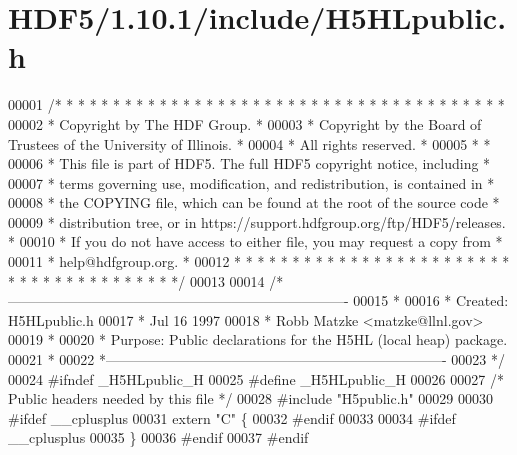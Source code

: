 \hypertarget{_h_d_f5_21_810_81_2include_2_h5_h_lpublic_8h_source}{}\section{H\+D\+F5/1.10.1/include/\+H5\+H\+Lpublic.h}
\label{_h_d_f5_21_810_81_2include_2_h5_h_lpublic_8h_source}

\begin{DoxyCode}
00001 \textcolor{comment}{/* * * * * * * * * * * * * * * * * * * * * * * * * * * * * * * * * * * * * * *}
00002 \textcolor{comment}{ * Copyright by The HDF Group.                                               *}
00003 \textcolor{comment}{ * Copyright by the Board of Trustees of the University of Illinois.         *}
00004 \textcolor{comment}{ * All rights reserved.                                                      *}
00005 \textcolor{comment}{ *                                                                           *}
00006 \textcolor{comment}{ * This file is part of HDF5.  The full HDF5 copyright notice, including     *}
00007 \textcolor{comment}{ * terms governing use, modification, and redistribution, is contained in    *}
00008 \textcolor{comment}{ * the COPYING file, which can be found at the root of the source code       *}
00009 \textcolor{comment}{ * distribution tree, or in https://support.hdfgroup.org/ftp/HDF5/releases.  *}
00010 \textcolor{comment}{ * If you do not have access to either file, you may request a copy from     *}
00011 \textcolor{comment}{ * help@hdfgroup.org.                                                        *}
00012 \textcolor{comment}{ * * * * * * * * * * * * * * * * * * * * * * * * * * * * * * * * * * * * * * */}
00013 
00014 \textcolor{comment}{/*-------------------------------------------------------------------------}
00015 \textcolor{comment}{ *}
00016 \textcolor{comment}{ * Created:             H5HLpublic.h}
00017 \textcolor{comment}{ *                      Jul 16 1997}
00018 \textcolor{comment}{ *                      Robb Matzke <matzke@llnl.gov>}
00019 \textcolor{comment}{ *}
00020 \textcolor{comment}{ * Purpose:             Public declarations for the H5HL (local heap) package.}
00021 \textcolor{comment}{ *}
00022 \textcolor{comment}{ *-------------------------------------------------------------------------}
00023 \textcolor{comment}{ */}
00024 \textcolor{preprocessor}{#ifndef \_H5HLpublic\_H}
00025 \textcolor{preprocessor}{#define \_H5HLpublic\_H}
00026 
00027 \textcolor{comment}{/* Public headers needed by this file */}
00028 \textcolor{preprocessor}{#include "H5public.h"}
00029 
00030 \textcolor{preprocessor}{#ifdef \_\_cplusplus}
00031 \textcolor{keyword}{extern} \textcolor{stringliteral}{"C"} \{
00032 \textcolor{preprocessor}{#endif}
00033 
00034 \textcolor{preprocessor}{#ifdef \_\_cplusplus}
00035 \}
00036 \textcolor{preprocessor}{#endif}
00037 \textcolor{preprocessor}{#endif}
\end{DoxyCode}
